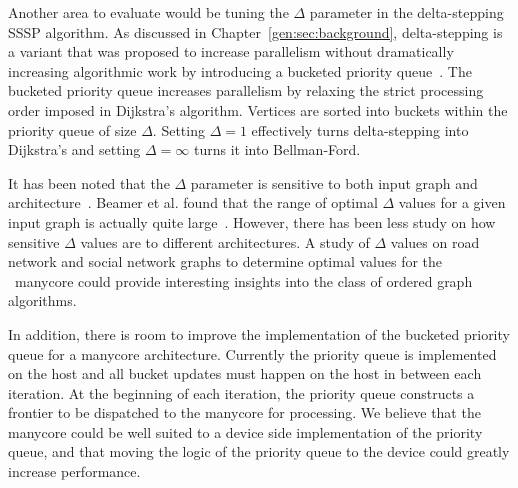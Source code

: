 Another area to evaluate would be tuning the $\Delta$ parameter in the delta-stepping SSSP algorithm.
As discussed in Chapter~\ref{gen:sec:background}, delta-stepping is a variant that was proposed to increase parallelism without dramatically increasing algorithmic work by introducing a bucketed priority queue~\cite{meyer2003delta}. 
The bucketed priority queue increases parallelism by relaxing the strict processing order imposed in Dijkstra's algorithm.
Vertices are sorted into buckets within the priority queue of size $\Delta$.
Setting $\Delta = 1$ effectively turns delta-stepping into Dijkstra's and setting $\Delta = \infty$ turns it into Bellman-Ford. 

It has been noted that the $\Delta$ parameter is sensitive to both input graph and architecture~\cite{beamer2016thesis}.
Beamer et al. found that the range of optimal $\Delta$ values for a given input graph is actually quite large~\cite{beamer2016thesis}. 
However, there has been less study on how sensitive $\Delta$ values are to different architectures. 
A study of $\Delta$ values on road network and social network graphs to determine optimal values for the \hb~manycore could provide interesting insights into the class of ordered graph algorithms.

In addition, there is room to improve the implementation of the bucketed priority queue for a manycore architecture.
Currently the priority queue is implemented on the host and all bucket updates must happen on the host in between each iteration.
At the beginning of each iteration, the priority queue constructs a frontier to be dispatched to the manycore for processing.
We believe that the manycore could be well suited to a device side implementation of the priority queue, and that moving the logic of the priority queue to the device could greatly increase performance.